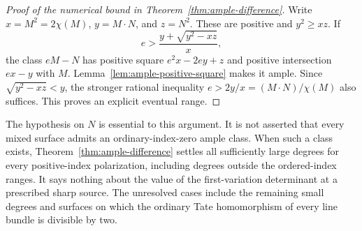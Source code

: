 \begin{proof}[Proof of the numerical bound in Theorem~\ref{thm:ample-difference}]
Write $x=M^2=2\chi(M)$, $y=M\cdot N$, and $z=N^2$. These are positive and $y^2\ge xz$. If
\[
                     e>\frac{y+\sqrt{y^2-xz}}{x},
\]
the class $eM-N$ has positive square $e^2x-2ey+z$ and positive intersection $ex-y$ with $M$. Lemma~\ref{lem:ample-positive-square} makes it ample. Since $\sqrt{y^2-xz}<y$, the stronger rational inequality $e>2y/x=(M\cdot N)/\chi(M)$ also suffices. This proves an explicit eventual range.
\end{proof}

The hypothesis on $N$ is essential to this argument. It is not asserted that every mixed surface admits an ordinary-index-zero ample class. When such a class exists, Theorem~\ref{thm:ample-difference} settles all sufficiently large degrees for every positive-index polarization, including degrees outside the ordered-index ranges. It says nothing about the value of the first-variation determinant at a prescribed sharp source. The unresolved cases include the remaining small degrees and surfaces on which the ordinary Tate homomorphism of every line bundle is divisible by two.

